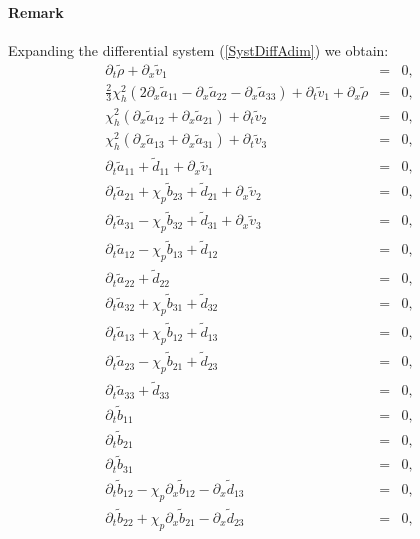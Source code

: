 \documentclass[
10pt, %
a4paper, %
oneside, %
headinclude,footinclude, %
table
]{scrartcl}
\begin{document}
\paragraph{Remark} Expanding the differential system (\ref{SystDiffAdim}) we obtain:\\
$$
\begin{array}{rcl}
\partial_{t}{\tilde{\rho }}+\partial_{x}{\tilde{v}_1}&=&0,\\   
\frac{2}{3} \chi _h^2 \left(2   \partial_{x}{\tilde{a}_{11}}-\partial_{x}{\tilde{a}_{22}}-\partial_{x}{\tilde{a}_{33}}\right)+\partial_{t}{\tilde{v}_1}+\partial_{x}{\tilde{\rho }}&=&0,\\   
\chi _h^2   \left(\partial_{x}{\tilde{a}_{12}}+\partial_{x}{\tilde{a}_{21}}\right)+\partial_{t}{\tilde{v}_2}&=&0,\\   
\chi_h^2\left(\partial_{x}{\tilde{a}_{13}}+\partial_{x}{\tilde{a}_{31}}\right)+\partial_{t}{\tilde{v}_3}&=&0,\\   
\partial_{t}{\tilde{a}_{11}}+\tilde{d}_{11}+\partial_{x}{\tilde{v}_1}&=&0,\\   
\partial_{t}{\tilde{a}_{21}}+\chi _p\tilde{b}_{23} +\tilde{d}_{21}+\partial_{x}{\tilde{v}_2}&=&0,\\   
\partial_{t}{\tilde{a}_{31}}-\chi _p\tilde{b}_{32}+\tilde{d}_{31}+\partial_{x}{\tilde{v}_3}&=&0,\\   
\partial_{t}{\tilde{a}_{12}}-\chi_p\tilde{b}_{13} +\tilde{d}_{12}&=&0,\\   
\partial_{t}{\tilde{a}_{22}}+\tilde{d}_{22}&=&0,\\   
\partial_{t}{\tilde{a}_{32}}+\chi _p\tilde{b}_{31} +\tilde{d}_{32}&=&0,\\   
\partial_{t}{\tilde{a}_{13}}+\chi_p\tilde{b}_{12} +\tilde{d}_{13}&=&0,\\   
\partial_{t}{\tilde{a}_{23}}-\chi_p\tilde{b}_{21} +\tilde{d}_{23}&=&0,\\   
\partial_{t}{\tilde{a}_{33}}+\tilde{d}_{33}&=&0,\\   
\partial_{t}{\tilde{b}_{11}}&=&0,\\   
\partial_{t}{\tilde{b}_{21}}&=&0,\\   
\partial_{t}{\tilde{b}_{31}}&=&0,\\   
\partial_{t}{\tilde{b}_{12}}-\chi _p\partial_{x}{\tilde{b}_{12}}-\partial_{x}{\tilde{d}_{13}}&=&0,\\   
\partial_{t}{\tilde{b}_{22}}+\chi _p\partial_{x}{\tilde{b}_{21}}-\partial_{x}{\tilde{d}_{23}}&=&0,\\   

\end{array}$$
\end{document}
